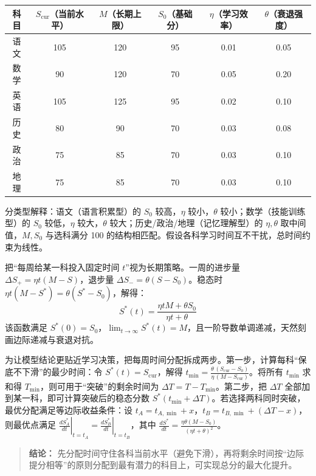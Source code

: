 \documentclass[10pt]{article}
\begin{document}
\begin{center}
\begin{tabular}{|c|c|c|c|c|c|}
\hline
科目 & $S_{\text{cur}}$（当前水平） & $M$（长期上限） & $S_0$（基础分） & $\eta$（学习效率） & $\theta$（衰退强度） \\
\hline
语文 & 105 & 120 & 95 & 0.01 & 0.05 \\
\hline
数学 & 90 & 120 & 70 & 0.05 & 0.20 \\
\hline
英语 & 105 & 125 & 95 & 0.02 & 0.10 \\
\hline
历史 & 80 & 90 & 70 & 0.03 & 0.08 \\
\hline
政治 & 75 & 85 & 70 & 0.03 & 0.10 \\
\hline
地理 & 75 & 85 & 70 & 0.03 & 0.10 \\
\hline
\end{tabular}
\end{center}

分类型解释：语文（语言积累型）的 $S_0$ 较高，$\eta$ 较小，$\theta$ 较小；数学（技能训练型）的 $S_0$ 较低，$\eta$ 较大，$\theta$ 较大；历史/政治/地理（记忆理解型）的 $\eta,\theta$ 取中间值，$M,S_0$ 与选科满分 100 的结构相匹配。假设各科学习时间互不干扰，总时间约束为线性。

把“每周给某一科投入固定时间 $t$”视为长期策略。一周的进步量 $\Delta S_+=\eta t(M-S)$，退步量 $\Delta S_-=\theta(S-S_0)$。稳态时 $\eta t(M-S^*) = \theta(S^*-S_0)$，解得：
$$
S^*(t) = \frac{\eta t M + \theta S_0}{\eta t + \theta}
$$
该函数满足 $S^*(0)=S_0$，$\lim_{t\to\infty}S^*(t)=M$，且一阶导数单调递减，天然刻画边际递减与衰退对抗。

为让模型结论更贴近学习决策，把每周时间分配拆成两步。第一步，计算每科“保底不下滑”的最少时间：令 $S^*(t)=S_{\text{cur}}$，解得 $t_{\min}=\frac{\theta\,(S_{\text{cur}}-S_0)}{\eta\,(M-S_{\text{cur}})}$。将所有 $t_{\min}$ 求和得 $T_{\min}$，则可用于“突破”的剩余时间为 $\Delta T=T-T_{\min}$。第二步，把 $\Delta T$ 全部加到某一科，即可计算突破后的稳态分数 $S^*(t_{\min}+\Delta T)$。若选择两科同时突破，最优分配满足等边际收益条件：设 $t_A=t_{A,\min}+x$，$t_B=t_{B,\min}+(\Delta T-x)$，则最优点满足 $\left.\frac{dS_A^*}{dt}\right|_{t=t_A}=\left.\frac{dS_B^*}{dt}\right|_{t=t_B}$，其中 $\frac{dS^*}{dt}=\frac{\eta\theta(M-S_0)}{\left(\eta t+\theta\right)^2}$。

\begin{quote}
\textbf{结论：} 先分配时间守住各科当前水平（避免下滑），再将剩余时间按“边际提分相等”的原则分配到最有潜力的科目上，可实现总分的最大化提升。
\end{quote}
\end{document}
